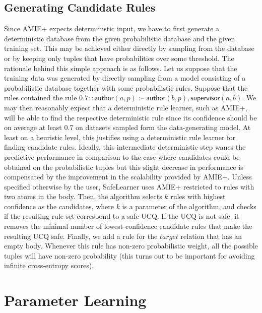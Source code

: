 \documentclass[akbc,twoside,11pt]{article}
\newcommand{\algorithmname}{SafeLearner\xspace}
\begin{document}
\subsection{Generating Candidate Rules} \label{sub:crg} Since AMIE+ expects deterministic input, we have to first generate a deterministic database from the given probabilistic database and the given training set. This may be achieved either directly by sampling from the database or by keeping only tuples that have probabilities over some threshold. The rationale behind this simple approach is as follows. Let us suppose that the training data was generated by directly sampling from a model consisting of a probabilistic database together with some probabilistic rules. Suppose that the rules contained the rule $0.7 :: \mathsf{author}(a,p) \mbox{ :--}\; \mathsf{author}(b,p), \mathsf{supervisor}(a,b)$. We may then reasonably expect that a deterministic rule learner, such as AMIE+, will be able to find the respective deterministic rule since its confidence should be on average at least $0.7$ on datasets sampled form the data-generating model. At least on a heuristic level, this justifies using a deterministic rule learner for finding candidate rules. Ideally, this intermediate deterministic step wanes the predictive performance in comparison to the case where candidates could be obtained on the probabilistic tuples \cite{DBLP:conf/ijcai/RaedtDTBV15} but this slight decrease in performance is compensated by the improvement in the scalability provided by AMIE+. Unless specified otherwise by the user, \algorithmname uses AMIE+ restricted to rules with two atoms in the body.
Then, the algorithm selects $k$ rules with highest confidence as the candidates, where $k$ is a parameter of the algorithm, and checks if the resulting rule set correspond to a safe UCQ. If the UCQ is not safe, it removes the minimal number of lowest-confidence candidate rules that make the resulting UCQ safe. Finally, we add a rule for the $target$ relation that has an empty body. Whenever this rule has non-zero probabilistic weight, all the possible tuples will have non-zero probability (this turns out to be important for avoiding infinite cross-entropy scores).

\section{Parameter Learning}
\label{sec:parameter_learning}

\end{document}
